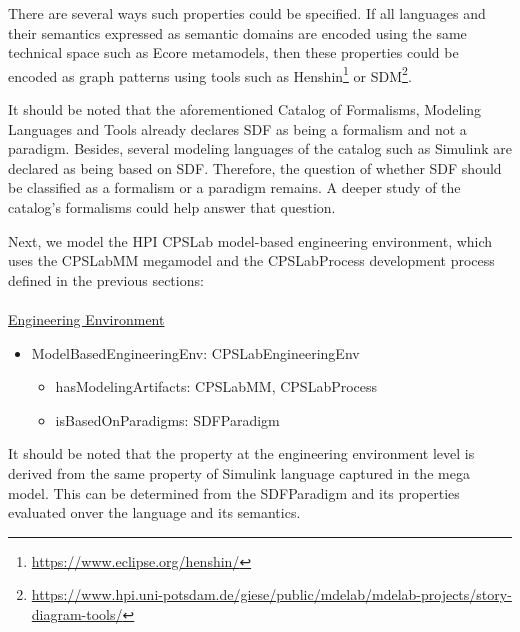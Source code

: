 There are several ways such properties could be specified. If all languages and their semantics expressed as semantic domains are encoded using the same technical space such as Ecore metamodels, then these properties could be encoded as graph patterns using tools such as Henshin\footnote{\url{https://www.eclipse.org/henshin/}} or SDM\footnote{\url{https://www.hpi.uni-potsdam.de/giese/public/mdelab/mdelab-projects/story-diagram-tools/}}.

It should be noted that the aforementioned Catalog of Formalisms, Modeling Languages and Tools already declares SDF as being a formalism and not a paradigm. Besides, several modeling languages of the catalog such as Simulink are declared as being based on SDF. Therefore, the question of whether SDF should be classified as a formalism or a paradigm remains. A deeper study of the catalog's formalisms could help answer that question.

Next, we model the HPI CPSLab model-based engineering environment, which uses the CPSLabMM megamodel and the CPSLabProcess development process defined in the previous sections:
\\
\\
\noindent\uline{Engineering Environment}
\begin{itemize}
\item ModelBasedEngineeringEnv: CPSLabEngineeringEnv
    \begin{itemize}
        \item hasModelingArtifacts: CPSLabMM, CPSLabProcess
        \item isBasedOnParadigms: SDFParadigm
    \end{itemize}
\end{itemize}

It should be noted that the  property at the engineering environment level is derived from the same property of Simulink language captured in the mega model. This can be determined from the SDFParadigm and its properties evaluated onver the language and its semantics.




